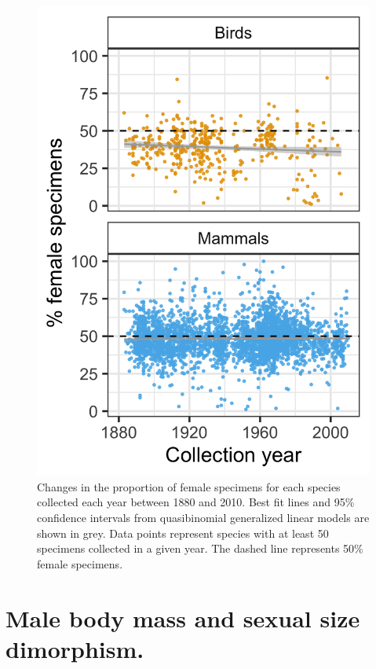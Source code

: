 \documentclass[a4paper, 12pt]{article}
\begin{document}
\begin{figure}[H]
 \centering
  \includegraphics[width = \linewidth]{figures/years-all.png}
  \caption{Changes in the proportion of female specimens for each species collected each year between 1880 and 2010. 
  Best fit lines and 95\% confidence intervals from quasibinomial generalized linear models are shown in grey. 
  Data points represent species with at least 50 specimens collected in a given year. 
  The dashed line represents 50\% female specimens.
}
  \label{fig-time}
\end{figure} 

\newpage
\section{Male body mass and sexual size dimorphism.}
\end{document}

